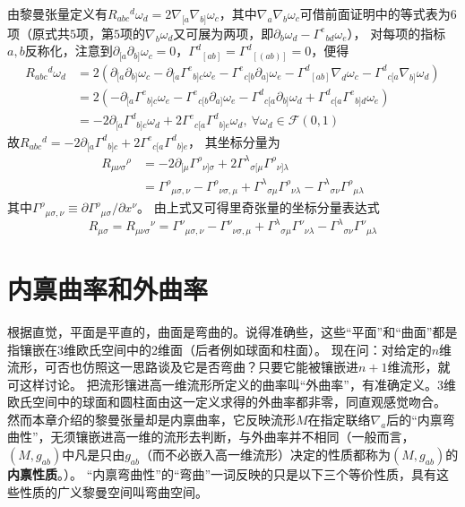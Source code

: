 由黎曼张量定义有$R_{abc}{}^d\omega_d = 2\nabla_{[a}\nabla_{b]}\omega_c$，其中$\nabla_a\nabla_b\omega_c$可借前面证明中的等式表为$6$项（原式共$5$项，第$5$项的$\nabla_b\omega_d$又可展为两项，即$\partial_b\omega_d - \Gamma^e{}_{bd}\omega_e$），
对每项的指标$a, b$反称化，注意到$\partial_{[a}\partial_{b]}\omega_c = 0$，$\Gamma^d{}_{[ab]} = \Gamma^d{}_{[(ab)]} = 0$，便得
$$\begin{aligned}
R_{abc}{}^d\omega_d & = 2(\partial_{[a}\partial_{b]}\omega_c - \partial_{[a}\Gamma^e{}_{b]c}\omega_e - \Gamma^e{}_{c[b}\partial_{a]}\omega_e - \Gamma^d{}_{[ab]}\nabla_d\omega_c - \Gamma^d{}_{c[a}\nabla_{b]}\omega_d) \\
& = 2(-\partial_{[a}\Gamma^e{}_{b]c}\omega_e - \Gamma^e{}_{c[b}\partial_{a]}\omega_e - \Gamma^d{}_{c[a}\partial_{b]}\omega_d + \Gamma^d{}_{c[a}\Gamma^e{}_{b]d}\omega_e) \\
& = -2\partial_{[a}\Gamma^d{}_{b]c}\omega_d + 2\Gamma^e{}_{c[a}\Gamma^d{}_{b]e}\omega_d, ~ \forall \omega_d \in \mathscr{F}(0, 1)
\end{aligned}$$
故$R_{abc}{}^d = -2\partial_{[a}\Gamma^d{}_{b]c} + 2\Gamma^e{}_{c[a}\Gamma^d{}_{b]e}$，
其坐标分量为
$$\begin{aligned}
R_{\mu\nu\sigma}{}^\rho & = -2\partial_{[\mu}\Gamma^\rho{}_{\nu]\sigma} + 2\Gamma^\lambda{}_{\sigma[\mu}\Gamma^\rho{}_{\nu]\lambda}\\
& = \Gamma^\rho{}_{\mu\sigma, \nu} - \Gamma^\rho{}_{\nu\sigma, \mu} + \Gamma^\lambda{}_{\sigma\mu}\Gamma^\rho{}_{\nu\lambda} - \Gamma^\lambda{}_{\sigma\nu}\Gamma^\rho{}_{\mu\lambda}
\end{aligned}$$
其中$\Gamma^\rho{}_{\mu\sigma, \nu} \equiv \partial\Gamma^\rho{}_{\mu\sigma} / \partial x^\nu$。
由上式又可得里奇张量的坐标分量表达式
$$R_{\mu\sigma} = R_{\mu\nu\sigma}{}^\nu = \Gamma^\nu{}_{\mu\sigma, \nu} - \Gamma^\nu{}_{\nu\sigma, \mu} + \Gamma^\lambda{}_{\sigma\mu}\Gamma^\nu{}_{\nu\lambda} - \Gamma^\lambda{}_{\sigma\nu}\Gamma^\nu{}_{\mu\lambda}$$

\section{内禀曲率和外曲率}

根据直觉，平面是平直的，曲面是弯曲的。说得准确些，这些``平面''和``曲面''都是指镶嵌在$3$维欧氏空间中的$2$维面（后者例如球面和柱面）。
现在问：对给定的$n$维流形，可否也仿照这一思路谈及它是否弯曲？只要它能被镶嵌进$n + 1$维流形，就可这样讨论。
把流形镶进高一维流形所定义的曲率叫``外曲率''，有准确定义。$3$维欧氏空间中的球面和圆柱面由这一定义求得的外曲率都非零，同直观感觉吻合。
然而本章介绍的黎曼张量却是内禀曲率，它反映流形$M$在指定联络$\nabla_a$后的``内禀弯曲性''，无须镶嵌进高一维的流形去判断，与外曲率并不相同（一般而言，$(M, g_{ab})$中凡是只由$g_{ab}$（而不必嵌入高一维流形）决定的性质都称为$(M, g_{ab})$的\textbf{内禀性质}。）。
``内禀弯曲性''的``弯曲''一词反映的只是以下三个等价性质，具有这些性质的广义黎曼空间叫弯曲空间。

